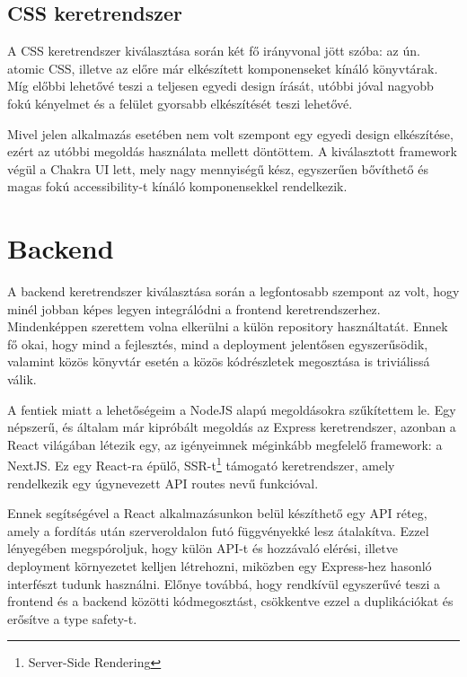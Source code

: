 \subsection{CSS keretrendszer}
A CSS keretrendszer kiválasztása során két fő irányvonal jött szóba: az ún. atomic CSS, illetve az előre már elkészített komponenseket kínáló könyvtárak.
Míg előbbi lehetővé teszi a teljesen egyedi design írását, utóbbi jóval nagyobb fokú kényelmet és a felület gyorsabb elkészítését teszi lehetővé.

Mivel jelen alkalmazás esetében nem volt szempont egy egyedi design elkészítése, ezért az utóbbi megoldás használata mellett döntöttem.
A kiválasztott framework végül a Chakra UI lett, mely nagy mennyiségű kész, egyszerűen bővíthető és magas fokú accessibility-t kínáló komponensekkel rendelkezik. \cite{ChakraUI}

\section{Backend}
A backend keretrendszer kiválasztása során a legfontosabb szempont az volt, hogy minél jobban képes legyen integrálódni a frontend keretrendszerhez.
Mindenképpen szerettem volna elkerülni a külön repository használtatát.
Ennek fő okai, hogy mind a fejlesztés, mind a deployment jelentősen egyszerűsödik, valamint közös könyvtár esetén a közös kódrészletek megosztása is triviálissá válik.

A fentiek miatt a lehetőségeim a NodeJS alapú megoldásokra szűkítettem le. Egy népszerű, és általam már kipróbált megoldás az Express keretrendszer, azonban a React világában létezik egy, az igényeimnek méginkább megfelelő framework: a NextJS.
Ez egy React-ra épülő, SSR-t\footnote{Server-Side Rendering} támogató keretrendszer, amely rendelkezik egy úgynevezett API routes nevű funkcióval.

Ennek segítségével a React alkalmazásunkon belül készíthető egy API réteg, amely a fordítás után szerveroldalon futó függvényekké lesz átalakítva.
Ezzel lényegében megspóroljuk, hogy külön API-t és hozzávaló elérési, illetve deployment környezetet kelljen létrehozni, miközben egy Express-hez hasonló interfészt tudunk használni.
Előnye továbbá, hogy rendkívül egyszerűvé teszi a frontend és a backend közötti kódmegosztást, csökkentve ezzel a duplikációkat és erősítve a type safety-t.

